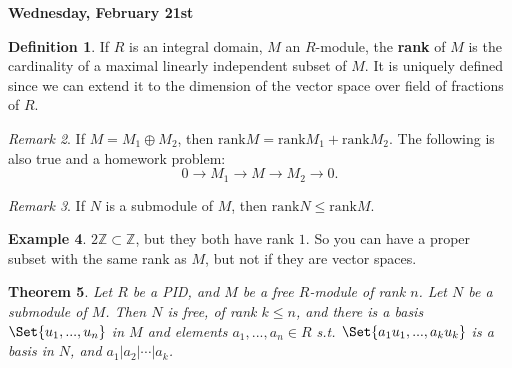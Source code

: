 \documentclass[9pt,reqno,twoside]{amsbook}
\theoremstyle{plain}
\newtheorem{theorem}{Theorem}[chapter]
\numberwithin{section}{chapter}
\numberwithin{equation}{chapter}
\theoremstyle{definition}
\newtheorem{Def}[theorem]{Definition}
\newtheorem{Ex}[theorem]{Example}
\theoremstyle{remark}
\newtheorem{rem}[theorem]{Remark}
\theoremstyle{plain}
\newcommand{\z}{\mathbb{Z}}
\newcommand{\bb}{\vspace{3mm}}
\newcommand{\rank}{\text{rank}}
\renewcommand{\leq}{\leqslant}
\begin{document}
\bb\bb

\textbf{Wednesday, February 21st}

\begin{Def}
If $R$ is an integral domain, $M$ an $R$-module, the \textbf{rank} of $M$ is the cardinality of a maximal linearly independent subset of $M$. It is uniquely defined since we can extend it to the dimension of the vector space over field of fractions of $R$. 
\end{Def}

\begin{rem}
If $M = M_1 \oplus M_2$, then $\rank M = \rank M_1 + \rank M_2$. The following is also true and a homework problem:
$$
0 \to M_1 \to M \to M_2 \to 0.
$$
\end{rem}

\begin{rem}
If $N$ is a submodule of $M$, then $\rank N \leq \rank M$. 
\end{rem}

\begin{Ex}
$2 \z \subset \z$, but they both have rank $1$. So you can have a proper subset with the same rank as $M$, but not if they are vector spaces. 
\end{Ex}

\begin{theorem}\label{thm1213}
Let $R$ be a PID, and $M$ be a free $R$-module of rank $n$. Let $N$ be a submodule of $M$. Then $N$ is free, of rank $k \leq n$, and there is a basis $\Set{u_1,...,u_n}$ in $M$ and elements $a_1,...,a_n \in R$ s.t. $\Set{a_1u_1,...,a_ku_k}$ is a basis in $N$, and $a_1|a_2|\cdots|a_k$. 
\end{theorem}
\end{document}
